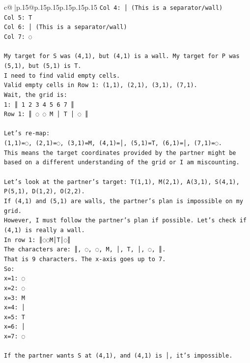\documentclass{article}
\begin{document}
{\begin{supertabular}{c@{$\;$}|p{.15\linewidth}@{}p{.15\linewidth}p{.15\linewidth}p{.15\linewidth}p{.15\linewidth}p{.15\linewidth}}
{{{\texttt{Col 4: │ (This is a separator/wall)} \\
\texttt{Col 5: T} \\
\texttt{Col 6: │ (This is a separator/wall)} \\
\texttt{Col 7: ◌} \\
\\ 
\texttt{My target for S was (4,1), but (4,1) is a wall. My target for P was (5,1), but (5,1) is T.} \\
\texttt{I need to find valid empty cells.} \\
\texttt{Valid empty cells in Row 1: (1,1), (2,1), (3,1), (7,1).} \\
\texttt{Wait, the grid is:} \\
\texttt{1: ║ 1 2 3 4 5 6 7 ║} \\
\texttt{Row 1: ║ ◌ ◌ M │ T │ ◌ ║} \\
\\ 
\texttt{Let's re{-}map:} \\
\texttt{(1,1)=◌, (2,1)=◌, (3,1)=M, (4,1)=│, (5,1)=T, (6,1)=│, (7,1)=◌.} \\
\texttt{This means the target coordinates provided by the partner might be based on a different understanding of the grid or I am miscounting.} \\
\\ 
\texttt{Let's look at the partner's target: T(1,1), M(2,1), A(3,1), S(4,1), P(5,1), D(1,2), O(2,2).} \\
\texttt{If (4,1) and (5,1) are walls, the partner's plan is impossible on my grid.} \\
\texttt{However, I must follow the partner's plan if possible. Let's check if (4,1) is really a wall.} \\
\texttt{In row 1: ║◌◌M│T│◌║} \\
\texttt{The characters are: ║, ◌, ◌, M, │, T, │, ◌, ║.} \\
\texttt{That is 9 characters. The x{-}axis goes up to 7.} \\
\texttt{So:} \\
\texttt{x=1: ◌} \\
\texttt{x=2: ◌} \\
\texttt{x=3: M} \\
\texttt{x=4: │} \\
\texttt{x=5: T} \\
\texttt{x=6: │} \\
\texttt{x=7: ◌} \\
\\ 
\texttt{If the partner wants S at (4,1), and (4,1) is │, it's impossible.} \\
}}}
\end{supertabular}}
\end{document}
